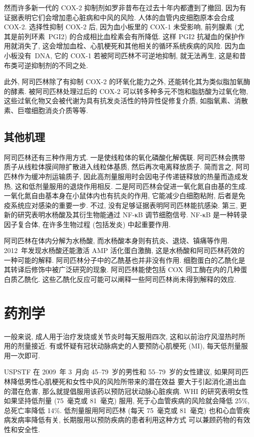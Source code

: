 然而许多新一代的 COX-2 抑制剂如罗非昔布在过去十年内都遭到了撤回,
因为有证据表明它们会增加患心脏病和中风的风险.
人体的血管内皮细胞原本会合成 COX-2.
选择性抑制 COX-2 后,
因为血小板里的 COX-1 未受影响,
前列腺素 (尤其是前列环素~PGI2) 的合成相比血栓素会有所降低.
这样 PGI2 抗凝血的保护作用就消失了,
这会增加血栓、心肌梗死和其他相关的循环系统疾病的风险.
因为血小板没有~DNA, 它的 COX-1 若被阿司匹林不可逆地抑制,
就无法再生, 这是和昔布类可逆抑制剂的不同之处.

此外, 阿司匹林除了有抑制 COX-2 的环氧化能力之外,
还能转化其为类似脂加氧酶的酵素.
被阿司匹林处理过后的 COX-2 可以转多种多元不饱和脂肪酸为过氧化物,
这些过氧化物又会被代谢为具有抗发炎活性的特异性促修复介质,
如脂氧素、消散素、巨噬细胞消炎介质等等.

\subsection{其他机理}

阿司匹林还有三种作用方式.
一是使线粒体的氧化磷酸化解偶联.
阿司匹林会携带质子从线粒体膜间隙扩散进入线粒体基质,
然后再次电离释放质子.
简而言之, 阿司匹林作为缓冲剂运输质子,
因此高剂量服用时会因电子传递链释放的热量而造成发热,
这和低剂量服用的退烧作用相反.
二是阿司匹林会促进一氧化氮自由基的生成.
一氧化氮自由基本身在小鼠体内也有抗炎的作用,
它能减少白细胞粘附, 后者是免疫系统应对感染的重要一步.
不过, 没有足够证据表明阿司匹林能抗感染.
第三, 更新的研究表明水杨酸及其衍生物能通过 NF-κB 调节细胞信号.
NF-κB 是一种转录因子复合体,
在许多生物过程 (包括发炎) 中起重要作用.

阿司匹林在体内分解为水杨酸,
而水杨酸本身则有抗炎、退烧、镇痛等作用.
2012~年发现水杨酸还能激活 AMP 活化蛋白激酶,
这是水杨酸和阿司匹林药效的一种可能的解释.
阿司匹林分子中的乙酰基也并非没有作用.
细胞蛋白的乙酰化是其转译后修饰中被广泛研究的现象.
阿司匹林能使包括 COX 同工酶在内的几种蛋白质乙酰化.
这些乙酰化反应可能可以阐释一些阿司匹林尚未得到解释的效应.

\section{药剂学}

一般来说, 成人用于治疗发烧或关节炎时每天服用四次,
这和以前治疗风湿热时所用的剂量接近.
有或怀疑有冠状动脉病史的人要预防心肌梗死 (MI),
每天低剂量服用一次即可.

USPSTF 在 2009~年 3~月向 45--79~岁的男性和 55--79~岁的女性建议,
如果阿司匹林降低男性心肌梗死和女性中风的风险所带来的潜在效益%
要大于引起消化道出血的潜在危害,
那么就提倡服用该药以预防冠状动脉心脏疾病.
WHI 的研究表明女性如果坚持低剂量 (75~毫克或 81~毫克) 服用,
死于心血管疾病的风险就会降低 25\%, 总死亡率降低 14\%.
低剂量服用阿司匹林 (每天 75~毫克或 81~毫克)
也和心血管疾病发病率降低有关,
长期服用以预防疾病的患者利用这种方式%
可以兼顾药物的有效性和安全性.

